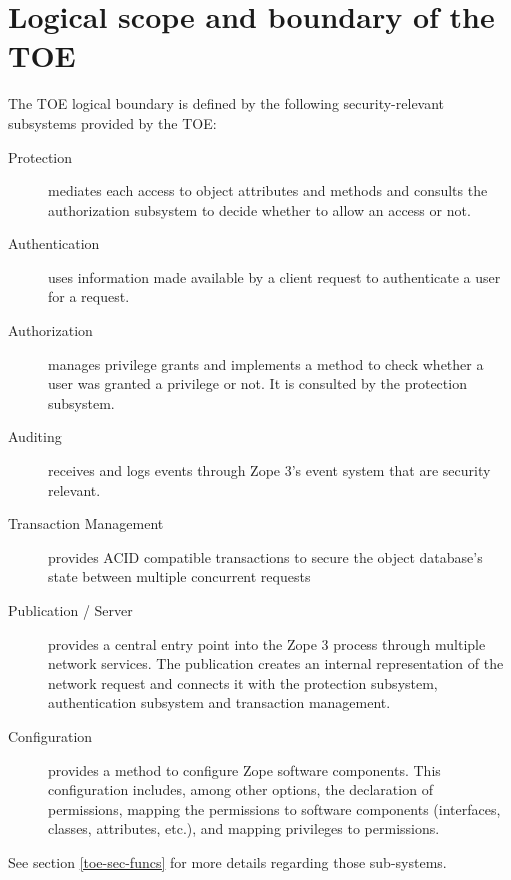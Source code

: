 \documentclass[12pt,english]{scrbook}
\begin{document}


\section{Logical scope and boundary of the TOE}

The TOE logical boundary is defined by the following security-relevant
subsystems provided by the TOE:

\begin{description}

  \item[Protection] mediates each access to object attributes and methods and
    consults the authorization subsystem to decide whether to allow an access
    or not.

  \item[Authentication] uses information made available by a client request to
  authenticate a user for a request.

  \item[Authorization] manages privilege grants and implements a method to
  check whether a user was granted a privilege or not. It is consulted by the
  protection subsystem.

  \item[Auditing] receives and logs events through Zope 3's event system that
  are security relevant.

  \item[Transaction Management] provides ACID compatible transactions to secure
  the object database's state between multiple concurrent requests 

  \item[Publication / Server] provides a central entry point into the Zope 3
  process through multiple network services. The publication creates an
  internal representation of the network request and connects it with the
  protection subsystem, authentication subsystem and transaction management.

  \item[Configuration] provides a method to configure Zope software components.
  This configuration includes, among other options, the declaration of
  permissions, mapping the permissions to software components (interfaces,
  classes, attributes, etc.), and mapping privileges to permissions.

\end{description}

See section \vref{toe-sec-funcs} for more details regarding those sub-systems.
\end{document}
